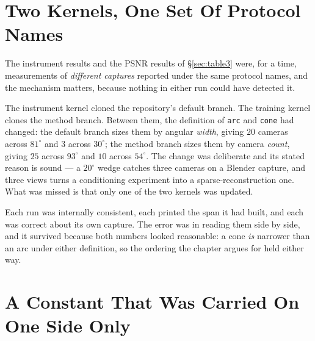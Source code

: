 \section{Two Kernels, One Set Of Protocol Names}
\label{sec:branchdefect}

The instrument results and the PSNR results of \S\ref{sec:table3} were, for a
time, measurements of \emph{different captures} reported under the same protocol
names, and the mechanism matters, because nothing in either run could have
detected it.

The instrument kernel cloned the repository's default branch. The training kernel
clones the method branch. Between them, the definition of \texttt{arc} and
\texttt{cone} had changed: the default branch sizes them by angular \emph{width},
giving $20$ cameras across $81^\circ$ and $3$ across $30^\circ$; the method
branch sizes them by camera \emph{count}, giving $25$ across $93^\circ$ and $10$
across $54^\circ$. The change was deliberate and its stated reason is sound --- a
$20^\circ$ wedge catches three cameras on a Blender capture, and three views turns a conditioning experiment into a sparse-reconstruction
one. What was missed
is that only one of the two kernels was updated.

Each run was internally consistent, each printed the span it had built, and each
was correct about its own capture. The error was in reading them side by side,
and it survived because both numbers looked reasonable: a cone \emph{is} narrower
than an arc under either definition, so the ordering the chapter argues for held
either way.


\section{A Constant That Was Carried On One Side Only}
\label{sec:m2defect}

